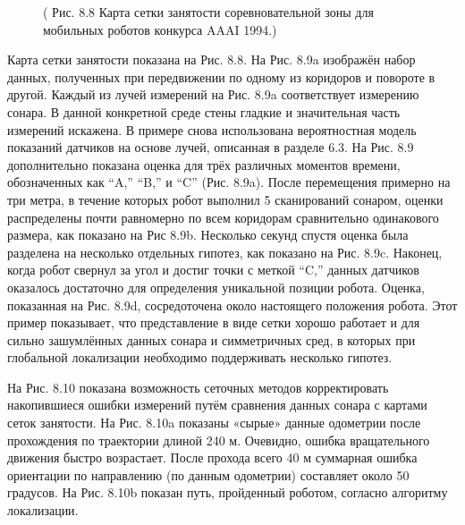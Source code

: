 \documentclass[10pt,a4paper]{article}
\begin{document}
\begin{figure}[H]
	\caption{ ( Рис. 8.8 Карта сетки занятости соревновательной зоны для мобильных роботов конкурса AAAI 1994.)}
	\label{fig:88orig}
\end{figure}

Карта сетки занятости показана на Рис. 8.8. На Рис. 8.9a изображён набор данных, полученных при передвижении по одному из коридоров и повороте в другой. Каждый из лучей измерений на Рис. 8.9a соответствует измерению сонара. В данной конкретной среде стены гладкие и значительная часть измерений искажена. В примере снова использована вероятностная модель показаний датчиков на основе лучей, описанная в разделе 6.3. На Рис. 8.9 дополнительно показана оценка для трёх различных моментов времени, обозначенных как “A,” “B,” и “C” (Рис. 8.9a). После перемещения примерно на три метра, в течение которых робот выполнил 5 сканирований сонаром, оценки распределены почти равномерно по всем коридорам сравнительно одинакового размера, как показано на Рис 8.9b. Несколько секунд спустя оценка была разделена на несколько отдельных гипотез, как показано на Рис. 8.9c. Наконец, когда робот свернул за угол и достиг точки с меткой “C,” данных датчиков оказалось достаточно для определения уникальной позиции робота. Оценка, показанная на Рис. 8.9d, сосредоточена около настоящего положения робота. Этот пример показывает, что представление в виде сетки хорошо работает и для сильно зашумлённых данных сонара и симметричных сред, в которых при глобальной локализации необходимо поддерживать несколько гипотез. 

На Рис. 8.10 показана возможность сеточных методов корректировать накопившиеся ошибки измерений путём сравнения данных сонара с картами сеток занятости. На Рис. 8.10a показаны «сырые» данные одометрии после прохождения по траектории длиной 240 м. Очевидно, ошибка вращательного движения быстро возрастает. После прохода всего 40 м суммарная ошибка ориентации по направлению (по данным одометрии) составляет около 50 градусов. На Рис. 8.10b показан путь, пройденный роботом, согласно алгоритму локализации.
\end{document}
